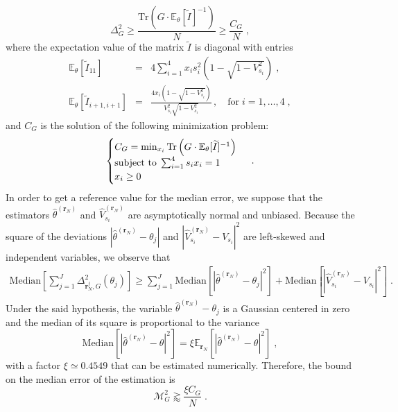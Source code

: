 \documentclass[superscriptaddress,notitlepage,pra]{revtex4-1}
\begin{document}
%
\begin{equation}
    \Delta^2_G \ge \frac{\text{Tr} \left( G \cdot \mathbb{E}_\theta[\widetilde{I}]^{-1} \right)}{N} \ge  \frac{C_G}{N}\; ,
\end{equation}
%
where the expectation value of the matrix $\widetilde{I}$ is diagonal with entries
%
\begin{eqnarray}
    \mathbb{E}_\theta [\widetilde{I}_{11}] &=& 4 \sum_{i=1}^4 x_i s_i^2 \left( 1 - \sqrt{1-V_{s_i}^2}\right) \; , \\
	\label{eq:averagePhase}
	\mathbb{E}_\theta [\widetilde{I}_{i+1, i+1}] &=& \frac{4 x_i \left( 1 - \sqrt{1-V_{s_i}^2} \right)}{V_{s_i}^2 \sqrt{1-V_{s_i}^2}}\, , \quad \text{for} \; i=1, \dots, 4 \; ,
	\label{eq:averageVisibilities}
\end{eqnarray}
%
and $C_G$ is the solution of the following minimization problem:
%
\begin{equation}
	\begin{cases}
	C_G = \min_{x_i} \text{Tr} \left( G \cdot \mathbb{E}_\theta [\widetilde{I}]^{-1} \right)\\
	\text{subject to} \; \sum_{i=1}^4 s_i x_i = 1 \\
	x_i \ge 0 
	\end{cases}\\
	\; .
\label{eq:semidefinite}
\end{equation}
%
In order to get a reference value for the median error, we suppose that the estimators $\hat{\theta}^{(\boldsymbol{r}_N)}$ and $\hat{V}^{(\boldsymbol{r}_N)}_{s_i}$ are asymptotically normal and unbiased. Because the square of the deviations $|\hat{\theta}^{({\mathbf r}_N)}-\theta_j|$ and $|\hat{V}_{s_i}^{({\mathbf r}_N)}-V_{s_i}|^2$ are left-skewed and independent variables, we observe that
%
\begin{eqnarray*}
    \text{Median} \left[ \sum_{j=1}^J \Delta^2_{\boldsymbol{r}_N^{j}, G} (\theta_j) \right] \ge  \sum_{j=1}^J \text{Median} [|\hat{\theta}^{({\mathbf r}_N)}-\theta_j|^2] + \text{Median} [|\hat{V}_{s_i}^{({\mathbf r}_N)}-V_{s_i}|^2] \; .
\end{eqnarray*}
% 
Under the said hypothesis, the variable $\hat{\theta}^{({\mathbf r}_N)}-\theta_j$ is a Gaussian centered in zero and the median of its square is proportional to the variance
%
\begin{equation}
	\text{Median} \left[ |\hat{\theta}^{({\mathbf r}_N)}-\theta|^2 \right]= \xi \mathbb{E}_{\boldsymbol{r}_N} [ |\hat{\theta}^{({\mathbf r}_N)}-\theta|^2 ] \; ,
	\label{eq:relationMedianMean}
\end{equation}
%
with a factor $\xi \simeq 0.4549$ that can be estimated numerically. Therefore, the bound on the median error of the estimation is
%
\begin{equation}
    \mathcal{M}^2_G \gtrapprox \frac{\xi C_G}{N} \; .
	\label{eq:medianCramer}
\end{equation}
%
\end{document}
